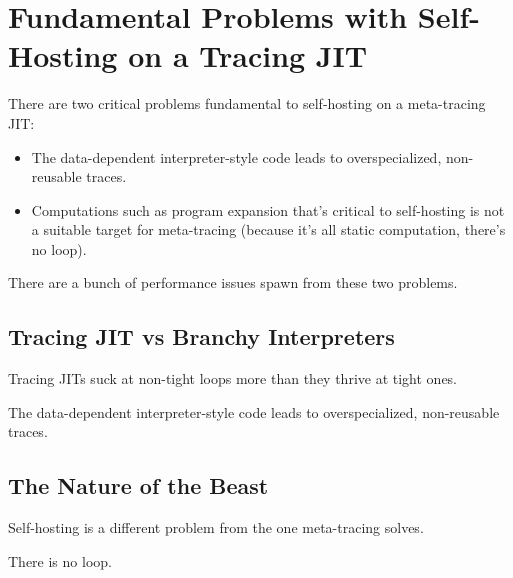\chapter{Fundamental Problems with Self-Hosting on a Tracing JIT}

	\begin{mainpoint}
		There are two critical problems fundamental to self-hosting on a meta-tracing JIT:
		\begin{itemize}
			\item The data-dependent interpreter-style code leads to overspecialized, non-reusable traces.
			\item Computations such as program expansion that's critical to self-hosting is not a suitable target for meta-tracing (because it's all static computation, there's no loop).
		\end{itemize}
		There are a bunch of performance issues spawn from these two problems. 
	\end{mainpoint}

	\section{Tracing JIT vs Branchy Interpreters}
		\begin{mainpoint}	
		 	Tracing JITs suck at non-tight loops more than they thrive at tight ones.

			The data-dependent interpreter-style code leads to overspecialized, non-reusable traces.
		\end{mainpoint}

	\section{The Nature of the Beast}
		\begin{mainpoint}
			Self-hosting is a different problem from the one meta-tracing solves.
		
			There is no loop.
		\end{mainpoint}
